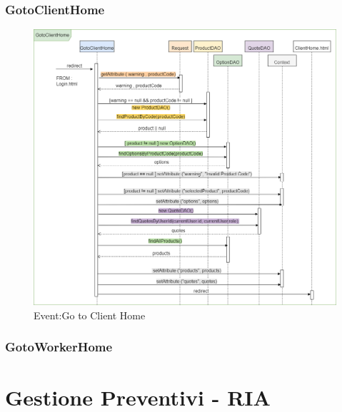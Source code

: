 \documentclass[a4paper, 12pt]{article}
\begin{document}
\subsubsection{GotoClientHome}
\begin{figure}[h!]
	\centering
	\includegraphics[width=1\textwidth]{PureHTML_images/GotoClientHome.png}
	\caption{Event:Go to Client Home}
	\label{figure:gotoclienthome_sd}
\end{figure}
\subsubsection{GotoWorkerHome}
\newpage
\section{Gestione Preventivi - RIA}
\end{document}
